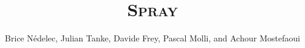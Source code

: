 \documentclass[conference]{IEEEtran}
\newcommand{\SCAMPLON}[0]{\textsc{Spray}}
\begin{document}
\title{\SCAMPLON{}}

\author{Brice N{\'e}delec, Julian Tanke, Davide Frey, Pascal Molli, and Achour
  Mostefaoui%
}
\date{}



\maketitle

\IEEEpeerreviewmaketitle











\clearpage
  
\end{document}

